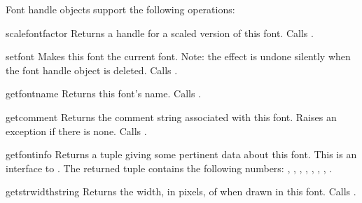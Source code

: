 Font handle objects support the following operations:

\begin{methoddesc}{scalefont}{factor}
Returns a handle for a scaled version of this font.
Calls .
\end{methoddesc}

\begin{methoddesc}{setfont}{}
Makes this font the current font.
Note: the effect is undone silently when the font handle object is
deleted.
Calls .
\end{methoddesc}

\begin{methoddesc}{getfontname}{}
Returns this font's name.
Calls .
\end{methoddesc}

\begin{methoddesc}{getcomment}{}
Returns the comment string associated with this font.
Raises an exception if there is none.
Calls .
\end{methoddesc}

\begin{methoddesc}{getfontinfo}{}
Returns a tuple giving some pertinent data about this font.
This is an interface to .
The returned tuple contains the following numbers:
\code{(}, , ,
, , , ,
\code{)}.
\end{methoddesc}

\begin{methoddesc}{getstrwidth}{string}
Returns the width, in pixels, of  when drawn in this font.
Calls .
\end{methoddesc}
